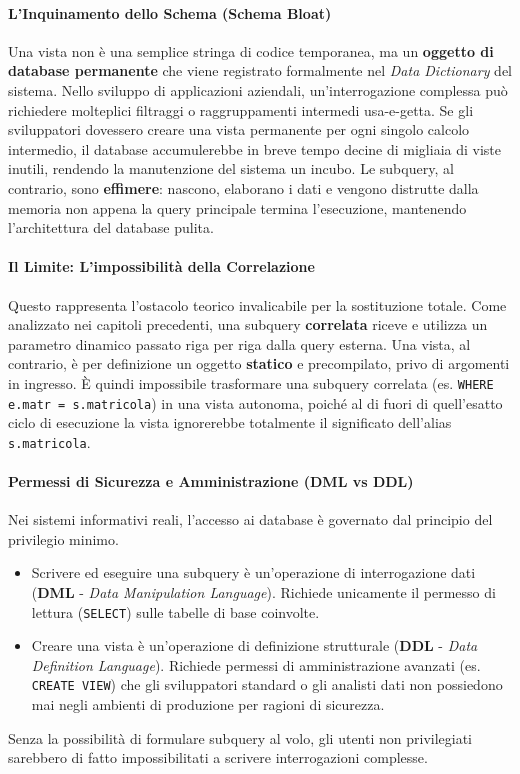\paragraph{L'Inquinamento dello Schema (Schema Bloat)}
Una vista non è una semplice stringa di codice temporanea, ma un \textbf{oggetto di database permanente} che viene registrato formalmente nel \textit{Data Dictionary} del sistema. 
Nello sviluppo di applicazioni aziendali, un'interrogazione complessa può richiedere molteplici filtraggi o raggruppamenti intermedi usa-e-getta. Se gli sviluppatori dovessero creare una vista permanente per ogni singolo calcolo intermedio, il database accumulerebbe in breve tempo decine di migliaia di viste inutili, rendendo la manutenzione del sistema un incubo. 
Le subquery, al contrario, sono \textbf{effimere}: nascono, elaborano i dati e vengono distrutte dalla memoria non appena la query principale termina l'esecuzione, mantenendo l'architettura del database pulita.

\paragraph{Il Limite: L'impossibilità della Correlazione}
Questo rappresenta l'ostacolo teorico invalicabile per la sostituzione totale. Come analizzato nei capitoli precedenti, una subquery \textbf{correlata} riceve e utilizza un parametro dinamico passato riga per riga dalla query esterna.
Una vista, al contrario, è per definizione un oggetto \textbf{statico} e precompilato, privo di argomenti in ingresso. È quindi impossibile trasformare una subquery correlata (es. \texttt{WHERE e.matr = s.matricola}) in una vista autonoma, poiché al di fuori di quell'esatto ciclo di esecuzione la vista ignorerebbe totalmente il significato dell'alias \texttt{s.matricola}.

\paragraph{Permessi di Sicurezza e Amministrazione (DML vs DDL)}
Nei sistemi informativi reali, l'accesso ai database è governato dal principio del privilegio minimo.
\begin{itemize}
    \item Scrivere ed eseguire una subquery è un'operazione di interrogazione dati (\textbf{DML} - \textit{Data Manipulation Language}). Richiede unicamente il permesso di lettura (\texttt{SELECT}) sulle tabelle di base coinvolte.
    \item Creare una vista è un'operazione di definizione strutturale (\textbf{DDL} - \textit{Data Definition Language}). Richiede permessi di amministrazione avanzati (es. \texttt{CREATE VIEW}) che gli sviluppatori standard o gli analisti dati non possiedono mai negli ambienti di produzione per ragioni di sicurezza.
\end{itemize}
Senza la possibilità di formulare subquery al volo, gli utenti non privilegiati sarebbero di fatto impossibilitati a scrivere interrogazioni complesse.

